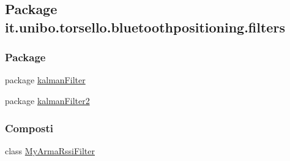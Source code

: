\hypertarget{namespaceit_1_1unibo_1_1torsello_1_1bluetoothpositioning_1_1filters}{}\subsection{Package it.\+unibo.\+torsello.\+bluetoothpositioning.\+filters}
\label{namespaceit_1_1unibo_1_1torsello_1_1bluetoothpositioning_1_1filters}
\subsubsection*{Package}
\begin{DoxyCompactItemize}
\item 
package \hyperlink{namespaceit_1_1unibo_1_1torsello_1_1bluetoothpositioning_1_1filters_1_1kalmanFilter}{kalman\+Filter}
\item 
package \hyperlink{namespaceit_1_1unibo_1_1torsello_1_1bluetoothpositioning_1_1filters_1_1kalmanFilter2}{kalman\+Filter2}
\end{DoxyCompactItemize}
\subsubsection*{Composti}
\begin{DoxyCompactItemize}
\item 
class \hyperlink{classit_1_1unibo_1_1torsello_1_1bluetoothpositioning_1_1filters_1_1MyArmaRssiFilter}{My\+Arma\+Rssi\+Filter}
\end{DoxyCompactItemize}
